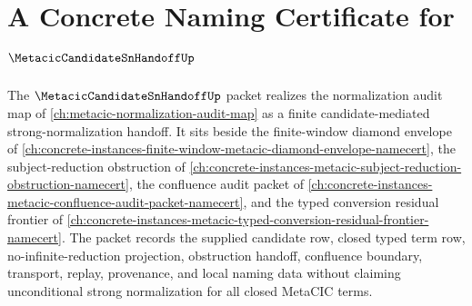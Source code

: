 \chapter{A Concrete Naming Certificate for $\MetacicCandidateSnHandoffUp$}
\label{ch:concrete-instances-metacic-candidate-sn-handoff-namecert}

The $\MetacicCandidateSnHandoffUp$ packet realizes the normalization audit map of \autoref{ch:metacic-normalization-audit-map} as a finite candidate-mediated strong-normalization handoff. It sits beside the finite-window diamond envelope of \autoref{ch:concrete-instances-finite-window-metacic-diamond-envelope-namecert}, the subject-reduction obstruction of \autoref{ch:concrete-instances-metacic-subject-reduction-obstruction-namecert}, the confluence audit packet of \autoref{ch:concrete-instances-metacic-confluence-audit-packet-namecert}, and the typed conversion residual frontier of \autoref{ch:concrete-instances-metacic-typed-conversion-residual-frontier-namecert}. The packet records the supplied candidate row, closed typed term row, no-infinite-reduction projection, obstruction handoff, confluence boundary, transport, replay, provenance, and local naming data without claiming unconditional strong normalization for all closed MetaCIC terms.

